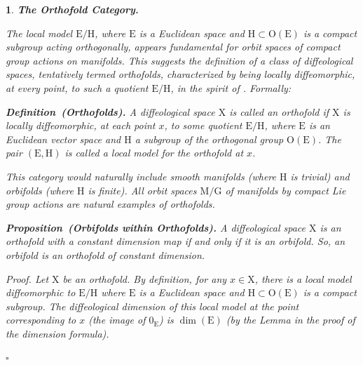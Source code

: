 \documentclass[10pt,reqno,letterpaper,twoside]{amsart}
\theoremstyle{article}
\newtheorem{article}{}
\def\artlabel[#1]{\textbf{#1.}}
\newenvironment{definition}[1]%
{\noindent\textbf{Definition#1.} \it}%
{}
\newenvironment{proposition}[1]%
{\noindent\textbf{Proposition#1.} \it}%
{}
\renewenvironment{proof}%
{\noindent\textit{Proof.}}%
{\nolinebreak\hfill $\square$}
\def \E{\mathrm E}
\def \G{\mathrm G}
\def \H{\mathrm H}
\def \M{\mathrm M}
\def \O{\mathrm O}
\def \X{\mathrm X}
\def \H{\mathrm H} %
\def \O{\mathrm O}
\begin{document}
  
  \begin{article}
    \artlabel[The Orthofold Category]
    \label{The_Orthofold_Category}
    
    The local model $\E/\H$,
    where $\E$ is a Euclidean space and $\H \subset \O(\E)$ is a compact subgroup acting orthogonally,
    appears fundamental for orbit spaces of compact group actions on manifolds.
    This suggests the definition of a class of diffeological spaces,
    tentatively termed \emph{orthofolds},
    characterized by being locally diffeomorphic,
    at every point, to such a quotient $\E/\H$,
    in the spirit of \cite[Section "Modeling Diffeology"]{PIZ13}.
    Formally:
    
    \begin{definition}{~(Orthofolds)}%
      \label{def:orthofold}
      A diffeological space $\X$ is called an \emph{orthofold} if $\X$ is locally diffeomorphic,
      at each point $x$,
      to some quotient $\E/\H$,
      where $\E$ is an Euclidean vector space and $\H$ a subgroup of the orthogonal group $\O(\E)$.
      The pair $(\E, \H)$ is called a \emph{local model} for the orthofold at $x$.
    \end{definition}
    
    This category would naturally include smooth manifolds (where $\H$ is trivial) and orbifolds (where $\H$ is finite).
    All orbit spaces $\M/\G$ of manifolds by compact Lie group actions are natural examples of orthofolds.
    
    \begin{proposition}{~(Orbifolds within Orthofolds)}
      \label{prop:orthofold_vs_orbifold}
      A diffeological space $\X$ is an orthofold with a constant dimension map if and only if it is an orbifold.
      So,
      an orbifold is an orthofold of constant dimension.
    \end{proposition}
    
    \begin{proof}
      Let $\X$ be an orthofold.
      By definition,
      for any $x \in \X$,
      there is a local model diffeomorphic to $\E/\H$ where $\E$ is a Euclidean space and $\H \subset \O(\E)$ is a compact subgroup.
      The diffeological dimension of this local model at the point corresponding to $x$ (the image of $0_\E$) is $\dim(\E)$ (by the Lemma in the proof of the dimension formula).
      

\end{proof}
\end{article}
\end{document}
